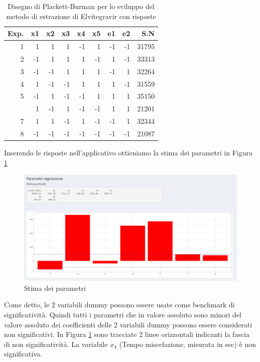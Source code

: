\documentclass[
  11pt,
]{book}
\begin{document}
\begin{table}

\caption{\label{tab:pbes2}Disegno di Plackett-Burman per lo sviluppo del metodo di estrazione di Elvitegravir con risposte}
\centering
\begin{tabular}[t]{rrrrrrrrr}
\toprule
Exp. & x1 & x2 & x3 & x4 & x5 & e1 & e2 & S.N\\
\midrule
1 & 1 & 1 & 1 & -1 & 1 & -1 & -1 & 31795\\
2 & -1 & 1 & 1 & 1 & -1 & 1 & -1 & 33313\\
3 & -1 & -1 & 1 & 1 & 1 & -1 & 1 & 32264\\
4 & 1 & -1 & -1 & 1 & 1 & 1 & -1 & 31559\\
5 & -1 & 1 & -1 & -1 & 1 & 1 & 1 & 35150\\
\addlinespace
6 & 1 & -1 & 1 & -1 & -1 & 1 & 1 & 21201\\
7 & 1 & 1 & -1 & 1 & -1 & -1 & 1 & 32344\\
8 & -1 & -1 & -1 & -1 & -1 & -1 & -1 & 21087\\
\bottomrule
\end{tabular}
\end{table}

\newpage

Inserendo le risposte nell'applicativo ottieniamo la stima dei parametri in Figura \ref{fig:pb5}

\begin{figure}[ht]

{\centering \includegraphics[width=1\linewidth]{Immagini/PB/05_coeff1} 

}

\caption{Stima dei parametri}\label{fig:pb5}
\end{figure}

Come detto, le 2 variabili dummy possono essere usate come benchmark di significatività. Quindi tutti i parametri che in valore assoluto sono minori del valore assoluto dei coefficienti delle 2 variabili dummy possono essere considerati non significativi. In Figura \ref{fig:pb5} sono tracciate 2 linee orizzontali indicanti la fascia di non significatività. La variabile \(x_4\) (Tempo miscelazione, misurata in sec) è non significativa.
\end{document}
